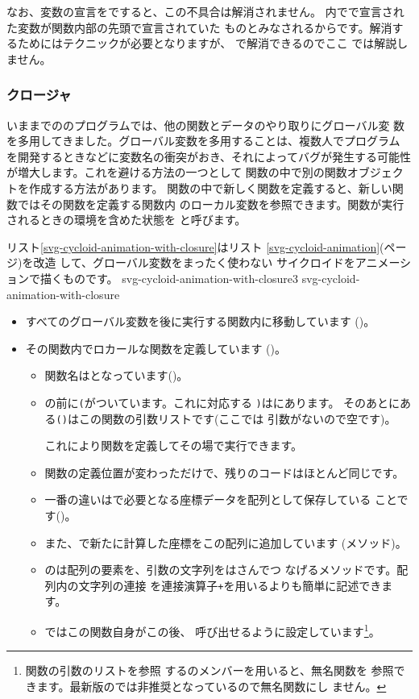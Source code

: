 なお、変数の宣言をですると、この不具合は解消されません。
内でで宣言された変数が関数内部の先頭で宣言されていた
ものとみなされるからです。解消す
るためにはテクニックが必要となりますが、 で解消できるのでここ
では解説しません。
\subsubsection{クロージャ}
いままでの\JS のプログラムでは、他の関数とデータのやり取りにグローバル変
数を多用してきました。グローバル変数を多用することは、複数人でプログラム
を開発するときなどに変数名の衝突がおき、それによってバグが発生する可能性
が増大します。これを避ける方法の一つとして%
関数の中で別の関数オブジェクトを作成する方法があります。
関数の中で新しく関数を定義すると、新しい関数ではその関数を定義する関数内
のローカル変数を参照できます。関数が実行されるときの環境を含めた状態を
と呼びます。

リスト\ref{svg-cycloid-animation-with-closure}はリスト
\ref{svg-cycloid-animation}(\pageref{svg-cycloid-animation}ページ)を改造
して、グローバル変数をまったく使わない
サイクロイドをアニメーションで描くものです。
{svg-cycloid-animation-with-closure3}
{svg-cycloid-animation-with-closure}
\begin{itemize}
 \item すべてのグローバル変数を後に実行する関数内に移動しています
       ()。
 \item その関数内でロカールな関数を定義しています
			 ()。
\begin{itemize}
 \item 関数名はとなっています()。
 \item {}の前に\texttt{(}がついています。これに対応する
			 \texttt{)}はにあります。
  そのあとにある\texttt{()}はこの関数の引数リストです(ここでは
			 引数がないので空です)。
			 
  これにより関数を定義してその場で実行できます。
 \item 関数の定義位置が変わっただけで、残りのコードはほとんど同じです。
 \item 一番の違いはで必要となる座標データを配列として保存している
			 ことです()。
 \item また、で新たに計算した座標をこの配列に追加しています
			 (メソッド)。
 \item {}のは配列の要素を、引数の文字列をはさんでつ
       なげるメソッドです。配列内の文字列の連接
       を連接演算子\texttt{+}を用いるよりも簡単に記述できます。
 \item {}ではこの関数自身がこの後、
			 呼び出せるように設定しています\footnote{関数の引数のリストを参照
			 するのメンバーを用いると、無名関数を
			 参照できます。最新版の\JS では非推奨となっているので無名関数にし
			 ません。}。
\end{itemize}

\end{itemize}
